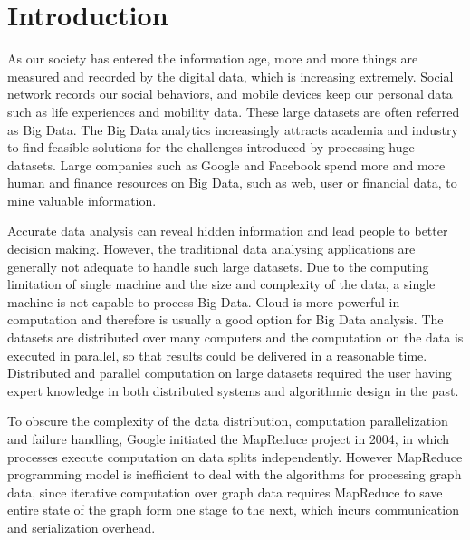 \chapter{Introduction}\label{chap:c1}

As our society has entered the information age, more and more things are measured and recorded by the digital data, which is increasing extremely. Social network records our social behaviors, and mobile devices keep our personal data such as life experiences and mobility data. These large datasets are often referred as Big Data. The Big Data analytics increasingly attracts academia and industry to find feasible solutions for the challenges introduced by processing huge datasets. Large companies such as Google and Facebook spend more and more human and finance resources on Big Data, such as web, user or financial data, to mine valuable information.

Accurate data analysis can reveal hidden information and lead people to better decision making. However, the traditional data analysing applications are generally not adequate to handle such large datasets. Due to the computing limitation of single machine and the size and complexity of the data, a single machine is not capable to process Big Data. Cloud is more powerful in computation and therefore is usually a good option for Big Data analysis. The datasets are distributed over many computers and the computation on the data is executed in parallel, so that results could be delivered in a reasonable time. Distributed and parallel computation on large datasets required the user having expert knowledge in both distributed systems and algorithmic design in the past.

To obscure the complexity of the data distribution, computation parallelization and failure handling, Google initiated the MapReduce project in 2004\cite{dean2008mapreduce}, in which processes execute computation on data splits independently. However MapReduce programming model is inefficient to deal with the algorithms for processing graph data, since iterative computation over graph data requires MapReduce to save entire state of the graph form one stage to the next, which incurs communication and serialization overhead. 

